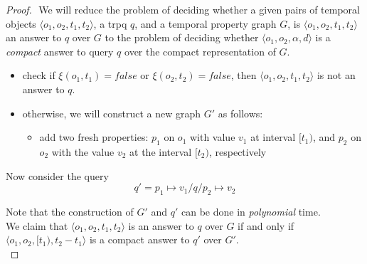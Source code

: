 



\begin{proof}
    $ $\newline
    We will reduce the problem of deciding whether a given pairs of temporal
    objects $\langle o_1,o_2,t_1,t_2 \rangle$, a trpq $q$, and a temporal
    property graph $G$, is $\langle o_1,o_2,t_1,t_2  \rangle$ an answer to
    $q$ over $G$ to the problem of deciding whether $\langle o_1,o_2,\alpha,d
    \rangle$ is a \emph{compact} answer to query $q$ over the compact representation of $G$. \\

    \begin{itemize}
        \item check if $\xi(o_1,t_1) = false$ or
            $\xi(o_2, t_2) = false$, then $\langle
            o_1,o_2,t_1,t_2 \rangle$ is not an answer to $q$.
        \item otherwise, we will construct a new graph $G'$ as follows:
            \begin{itemize}
        \item add two fresh properties: $p_1$ on $o_1$ with value $v_1$ at
            interval $[t_1)$, and $p_2$ on $o_2$ with the value $v_2$ at
            the interval $[t_2)$, respectively

            \end{itemize}
        \end{itemize}
        Now consider the query
        \[
            q' = p_1 \mapsto v_1/q/p_2 \mapsto v_2
        \]

\noindent Note that the construction of $G'$ and $q'$ can be done in \emph{polynomial} time. \\

\noindent We claim that $\langle o_1,o_2,t_1,t_2 \rangle$ is an answer to $q$ over $G$ if and only if $\langle o_1,o_2,[t_1),t_2 - t_1 \rangle$ is a compact answer to $q'$ over $G'$. \\


\end{proof}
